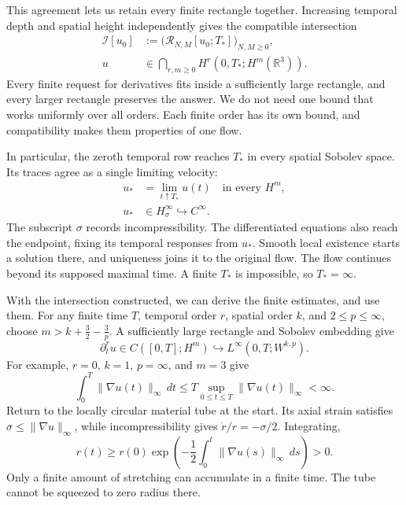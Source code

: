 This agreement lets us retain every finite rectangle together. Increasing
temporal depth and spatial height independently gives the compatible
intersection
\[
 \begin{aligned}
 \mathcal I[u_0]
 &:=\bigl(\mathcal R_{N,M}[u_0;T_*]\bigr)_{N,M\ge0},\\
 u&\in\bigcap_{r,m\ge0}H^r(0,T_*;H^m(\mathbb R^3)).
 \end{aligned}
\]
Every finite request for derivatives fits inside a sufficiently large
rectangle, and every larger rectangle preserves the answer. We do not
need one bound that works uniformly over all orders. Each finite order
has its own bound, and compatibility makes them properties of one flow.

In particular, the zeroth temporal row reaches \(T_*\) in every spatial
Sobolev space. Its traces agree as a single limiting velocity:
\[
 \begin{aligned}
 u_*&=\lim_{t\uparrow T_*}u(t)\quad\text{in every }H^m,\\
 u_*&\in H^\infty_\sigma\hookrightarrow C^\infty.
 \end{aligned}
\]
The subscript \(\sigma\) records incompressibility. The differentiated
equations also reach the endpoint, fixing its temporal responses from
\(u_*\). Smooth local existence starts a solution there, and uniqueness
joins it to the original flow. The flow continues beyond its supposed
maximal time. A finite \(T_*\) is impossible, so \(T_*=\infty\).

With the intersection constructed, we can derive the finite estimates,
and use them. For any finite time \(T\), temporal order \(r\), spatial
order \(k\), and \(2\le p\le\infty\), choose
\(m>k+\tfrac32-\tfrac3p\). A sufficiently large rectangle and Sobolev
embedding give
\[
 \partial_t^ru\in C([0,T];H^m)
 \hookrightarrow L^\infty(0,T;W^{k,p}).
\]
For example, \(r=0\), \(k=1\), \(p=\infty\), and \(m=3\) give
\[
 \int_0^T\|\nabla u(t)\|_\infty\,dt
 \le T\sup_{0\le t\le T}\|\nabla u(t)\|_\infty<\infty.
\]
Return to the locally circular material tube at the start.
Its axial strain satisfies \(\sigma\le\|\nabla u\|_\infty\), while
incompressibility gives \(\dot r/r=-\sigma/2\). Integrating,
\[
 r(t)\ge r(0)\exp\!\left(
 -\frac12\int_0^t\|\nabla u(s)\|_\infty\,ds
 \right)>0.
\]
Only a finite amount of stretching can accumulate in a finite time.
The tube cannot be squeezed to zero radius there.

\endgroup
